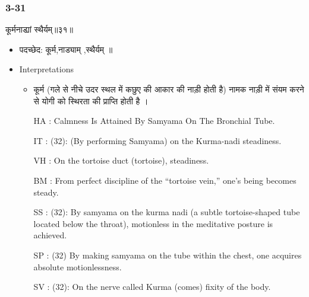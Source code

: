 \begin{frame}[fragile]\frametitle{3-31}
\begin{sanskrit}
कूर्मनाड्यां स्थैर्यम्॥३१॥
\end{sanskrit}

	\begin{itemize}
	\item पदच्छेद:  कूर्म,नाड्याम् ,स्थैर्यम् ॥
	\item Interpretations
		\begin{itemize}	
		\item कूर्म (गले से नीचे उदर स्थल में कछुए की आकार की नाड़ी होती है) नामक नाड़ी में संयम करने से योगी को स्थिरता की प्राप्ति होती है ।
		\item [HA]: Calmness Is Attained By Samyama On The Bronchial Tube.
		\item [IT]: (32): (By performing Samyama) on the Kurma-nadi steadiness.
		\item [VH]: On the tortoise duct (tortoise), steadiness.
		\item [BM]: From perfect discipline of the “tortoise vein,” one’s being becomes steady.
		\item [SS]: (32): By samyama on the kurma nadi (a subtle tortoise-shaped tube located below the throat), motionless in the meditative posture is achieved.
		\item [SP]: (32) By making samyama on the tube within the chest, one acquires absolute motionlessness.
		\item [SV]: (32): On the nerve called Kurma (comes) fixity of the body. 
		\end{itemize}
	\end{itemize}
\end{frame}


